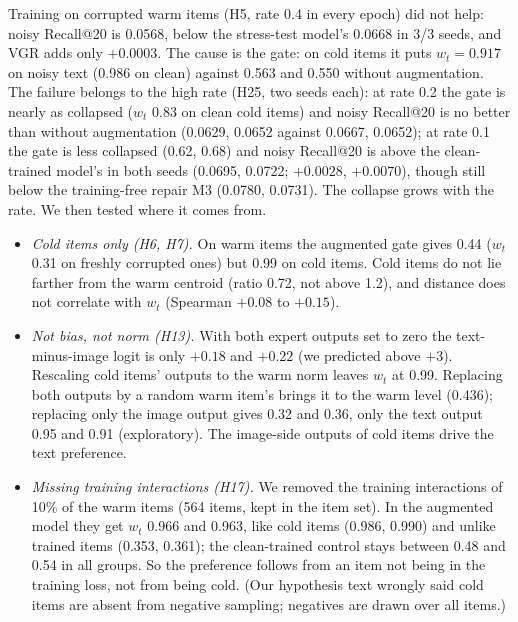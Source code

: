 \documentclass[conference]{IEEEtran}
\begin{document}
Training on corrupted warm items (H5, rate 0.4 in every epoch) did not help: noisy Recall@20 is 0.0568, below the stress-test model's 0.0668 in 3/3 seeds, and VGR adds only $+0.0003$. The cause is the gate: on cold items it puts $w_t=0.917$ on noisy text (0.986 on clean) against 0.563 and 0.550 without augmentation. The failure belongs to the high rate (H25, two seeds each): at rate 0.2 the gate is nearly as collapsed ($w_t$ 0.83 on clean cold items) and noisy Recall@20 is no better than without augmentation (0.0629, 0.0652 against 0.0667, 0.0652); at rate 0.1 the gate is less collapsed (0.62, 0.68) and noisy Recall@20 is above the clean-trained model's in both seeds (0.0695, 0.0722; $+0.0028$, $+0.0070$), though still below the training-free repair M3 (0.0780, 0.0731). The collapse grows with the rate. We then tested where it comes from.
\begin{itemize}
\item \emph{Cold items only (H6, H7).} On warm items the augmented gate gives 0.44 ($w_t$ 0.31 on freshly corrupted ones) but 0.99 on cold items. Cold items do not lie farther from the warm centroid (ratio 0.72, not above 1.2), and distance does not correlate with $w_t$ (Spearman $+0.08$ to $+0.15$).
\item \emph{Not bias, not norm (H13).} With both expert outputs set to zero the text-minus-image logit is only $+0.18$ and $+0.22$ (we predicted above $+3$). Rescaling cold items' outputs to the warm norm leaves $w_t$ at 0.99. Replacing both outputs by a random warm item's brings it to the warm level (0.436); replacing only the image output gives 0.32 and 0.36, only the text output 0.95 and 0.91 (exploratory). The image-side outputs of cold items drive the text preference.
\item \emph{Missing training interactions (H17).} We removed the training interactions of 10\% of the warm items (564 items, kept in the item set). In the augmented model they get $w_t$ 0.966 and 0.963, like cold items (0.986, 0.990) and unlike trained items (0.353, 0.361); the clean-trained control stays between 0.48 and 0.54 in all groups. So the preference follows from an item not being in the training loss, not from being cold. (Our hypothesis text wrongly said cold items are absent from negative sampling; negatives are drawn over all items.)

\end{itemize}
\end{document}
